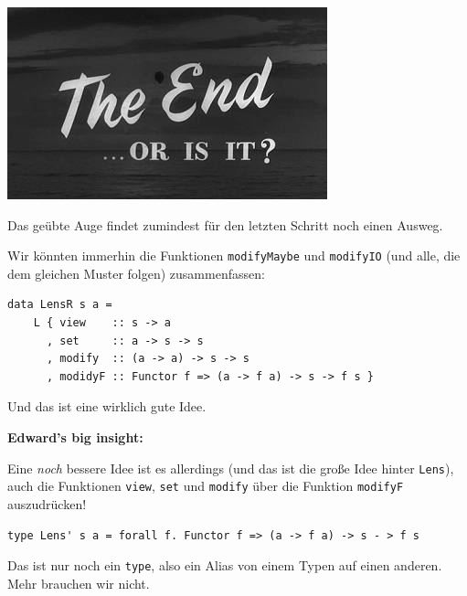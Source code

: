 \documentclass{beamer}
\begin{document}

\begin{frame}

\begin{center}
\includegraphics[scale=1]{the-end-or-is-it.jpg} 
\end{center}

\end{frame}


\begin{frame}[fragile]
Das geübte Auge findet zumindest für den letzten Schritt noch einen Ausweg.
\pause

Wir könnten immerhin die Funktionen \texttt{modifyMaybe} und \texttt{modifyIO} (und alle, die dem gleichen Muster folgen) zusammenfassen:

\begin{verbatim}
data LensR s a =
    L { view    :: s -> a
      , set     :: a -> s -> s 
      , modify  :: (a -> a) -> s -> s 
      , modidyF :: Functor f => (a -> f a) -> s -> f s }
\end{verbatim}

Und das ist eine wirklich gute Idee. 

\end{frame}


\begin{frame}[fragile]

\textbf{Edward's big insight:}
\pause
\smallskip

Eine \emph{noch} bessere Idee ist es allerdings (und das ist die große Idee hinter \texttt{Lens}), auch die Funktionen \texttt{view}, \texttt{set} und \texttt{modify} über die Funktion \texttt{modifyF} auszudrücken!
\pause
\smallskip\smallskip

\begin{verbatim}
type Lens' s a = forall f. Functor f => (a -> f a) -> s - > f s
\end{verbatim}
\pause
\smallskip\smallskip

Das ist nur noch ein \texttt{type}, also ein Alias von einem Typen auf einen anderen. Mehr brauchen wir nicht.

\end{frame}
\end{document}
